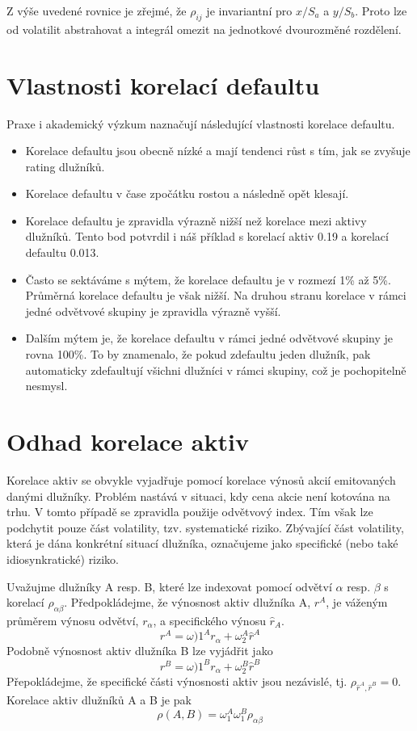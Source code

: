 Z výše uvedené rovnice je zřejmé, že $\rho_{ij}$ je invariantní pro $x / S_a$ a $y / S_b$. Proto lze od volatilit abstrahovat a integrál omezit na jednotkové dvourozměné rozdělení.

\section{Vlastnosti korelací defaultu}

Praxe i akademický výzkum naznačují následující vlastnosti korelace defaultu.
\begin{itemize}
\item Korelace defaultu jsou obecně nízké a mají tendenci růst s tím, jak se zvyšuje rating dlužníků.
\item Korelace defaultu v čase zpočátku rostou a následně opět klesají.
\item Korelace defaultu je zpravidla výrazně nižší než korelace mezi aktivy dlužníků. Tento bod potvrdil i náš příklad s korelací aktiv 0.19 a korelací defaultu 0.013.
\item Často se sektáváme s mýtem, že korelace defaultu je v rozmezí 1\% až 5\%. Průměrná korelace defaultu je však nižší. Na druhou stranu korelace v rámci jedné odvětvové skupiny je zpravidla výrazně vyšší.
\item Dalším mýtem je, že korelace defaultu v rámci jedné odvětvové skupiny je rovna 100\%. To by znamenalo, že pokud zdefaultu jeden dlužník, pak automaticky zdefaultují všichni dlužníci v rámci skupiny, což je pochopitelně nesmysl.
\end{itemize}

\section{Odhad korelace aktiv}

Korelace aktiv se obvykle vyjadřuje pomocí korelace výnosů akcií emitovaných danými dlužníky. Problém nastává v situaci, kdy cena akcie není kotována na trhu. V tomto případě se zpravidla použije odvětvový index. Tím však lze podchytit pouze část volatility, tzv. systematické riziko. Zbývající část volatility, která je dána konkrétní situací dlužníka, označujeme jako specifické (nebo také idiosynkratické) riziko.

Uvažujme dlužníky A resp. B, které lze indexovat pomocí odvětví $\alpha$ resp. $\beta$ s korelací $\rho_{\alpha \beta}$. Předpokládejme, že výnosnost aktiv dlužníka A, $r^A$, je váženým průměrem výnosu odvětví, $r_{\alpha}$, a specifického výnosu $\hat{r}_A$.
\begin{equation*}
r^A = \omega)1^A r_{\alpha} + \omega_2^A \hat{r}^A
\end{equation*}
Podobně výnosnost aktiv dlužníka B lze vyjádřit jako
\begin{equation*}
r^B = \omega)1^B r_{\alpha} + \omega_2^B \hat{r}^B
\end{equation*}
Přepokládejme, že specifické části výnosnosti aktiv jsou nezávislé, tj. $\rho_{\hat{r}^A, \hat{r}^B} = 0$. Korelace aktiv dlužníků A a B je pak
\begin{equation*}
\rho(A,B) = \omega_1^A \omega_1^B \rho_{\alpha \beta}
\end{equation*}

